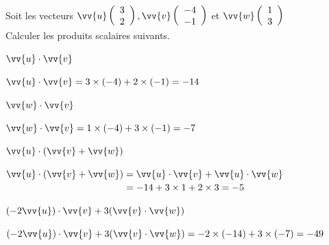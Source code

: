 \documentclass[12pt,a4paper]{article}  %
\begin{document}
Soit les vecteurs $\vv{u}\left(\begin{array}{l}3 \\ 2\end{array}\right), \vv{v}\left(\begin{array}{c}-4 \\ -1\end{array}\right)$ et $\vv{w}\left(\begin{array}{l}1 \\ 3\end{array}\right)$\\
Calculer les produits scalaires suivants.
\begin{enumMet}
    \item $\vv{u} \cdot \vv{v}$\\
    \begin{corrBox}
        $\vv{u} \cdot \vv{v}=3\times(-4)+2\times(-1)=-14$
    \end{corrBox}
    \item $\vv{w} \cdot \vv{v}$\\
    \begin{corrBox}
        $\vv{w} \cdot \vv{v}=1\times(-4)+3\times(-1)=-7$
    \end{corrBox}
    \item {} $\vv{u} \cdot(\vv{v}+\vv{w})$\\
    \begin{corrBox}
        $\vv{u} \cdot(\vv{v}+\vv{w})= \vv{u} \cdot \vv{v}+\vv{u} \cdot \vv{w}$\\
        $\phantom{\vv{u} \cdot(\vv{v}+\vv{w})}=-14+3\times1+2\times3=-5$
    \end{corrBox}
    \item $(-2 \vv{u}) \cdot \vv{v}+3(\vv{v} \cdot \vv{w})$\\
    \begin{corrBox}
        $(-2 \vv{u}) \cdot \vv{v}+3(\vv{v} \cdot \vv{w})=-2\times(-14)+3\times(-7)=-49$
    \end{corrBox}
\end{enumMet}
\end{document}

